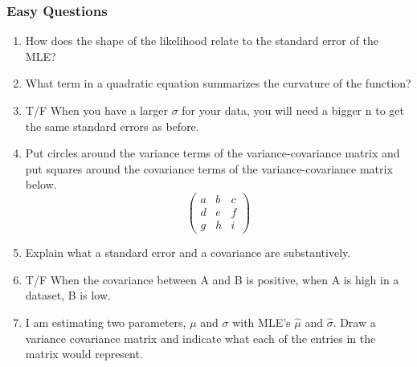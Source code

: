 \documentclass[11pt]{article}
\begin{document}
\subsubsection{Easy Questions}
\begin{enumerate}
\item How does the shape of the likelihood relate to the standard error of the MLE? \index{}

\item What term in a quadratic equation summarizes the curvature of the function? 

\item T/F When you have a larger $\sigma$ for your data, you will need a bigger n to get the same standard errors as before. 

\item Put circles around the variance terms of the variance-covariance matrix and put squares around the covariance terms of the variance-covariance matrix below. 
\[\left(\begin{array}{ccc}
a & b & c \\
d & e & f \\
g & h & i \end{array} \right) \]
\item Explain what a standard error and a covariance are substantively. 

\item T/F When the covariance between A and B is positive, when A is high in a dataset, B is low. 

\item I am estimating two parameters, $\mu$ and $\sigma$ with MLE's $\hat{\mu}$ and $\hat{\sigma}$.  Draw a variance covariance matrix and indicate what each of the entries in the matrix would represent. 
\end{enumerate}
\end{document}

